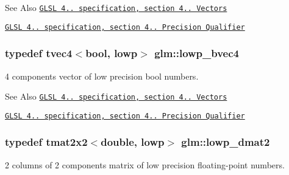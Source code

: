 \begin{DoxySeeAlso}{See Also}
\href{http://www.opengl.org/registry/doc/GLSLangSpec.4.20.8.pdf}{\tt G\-L\-S\-L 4.. specification, section 4.. Vectors} 

\href{http://www.opengl.org/registry/doc/GLSLangSpec.4.20.8.pdf}{\tt G\-L\-S\-L 4.. specification, section 4.. Precision Qualifier} 
\end{DoxySeeAlso}
\hypertarget{group__core__precision_ga512926597aea7a1afe60ee7b983db86d}{
\subsubsection[{lowp\-\_\-bvec4}]{\setlength{\rightskip}{0pt plus 5cm}typedef tvec4$<$bool, lowp$>$ {\bf glm\-::lowp\-\_\-bvec4}}}\label{group__core__precision_ga512926597aea7a1afe60ee7b983db86d}
4 components vector of low precision bool numbers.

\begin{DoxySeeAlso}{See Also}
\href{http://www.opengl.org/registry/doc/GLSLangSpec.4.20.8.pdf}{\tt G\-L\-S\-L 4.. specification, section 4.. Vectors} 

\href{http://www.opengl.org/registry/doc/GLSLangSpec.4.20.8.pdf}{\tt G\-L\-S\-L 4.. specification, section 4.. Precision Qualifier} 
\end{DoxySeeAlso}
\hypertarget{group__core__precision_ga42a83e53bbcc740b6ae501fec19dda69}{
\subsubsection[{lowp\-\_\-dmat2}]{\setlength{\rightskip}{0pt plus 5cm}typedef tmat2x2$<$double, lowp$>$ {\bf glm\-::lowp\-\_\-dmat2}}}\label{group__core__precision_ga42a83e53bbcc740b6ae501fec19dda69}
2 columns of 2 components matrix of low precision floating-\/point numbers.

